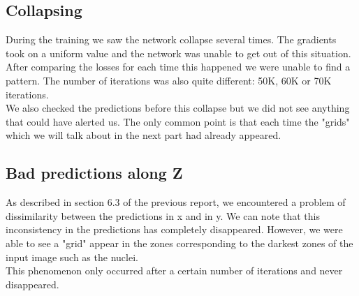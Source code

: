 \subsection{Collapsing}

During the training we saw the network collapse several times. The gradients took on a uniform value and the network was unable to get out of this situation. After comparing the losses for each time this happened we were unable to find a pattern. The number of iterations was also quite different: 50K, 60K or 70K iterations.\\

We also checked the predictions before this collapse but we did not see anything that could have alerted us. The only common point is that each time the "grids" which we will talk about in the next part had already appeared.

\subsection{Bad predictions along Z}

As described in section 6.3 of the previous report, we encountered a problem of dissimilarity between the predictions in x and in y. We can note that this inconsistency in the predictions has completely disappeared. However, we were able to see a "grid" appear in the zones corresponding to the darkest zones of the input image such as the nuclei.\\

This phenomenon only occurred after a certain number of iterations and never disappeared.\\


